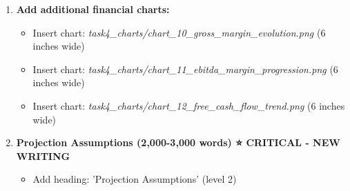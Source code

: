 \documentclass[11pt]{article}
\begin{document}
\begin{enumerate}[leftmargin=*,itemsep=2pt,topsep=2pt]
\begin{itemize}[leftmargin=*,itemsep=2pt,topsep=2pt]
\item {} \textbf{Create Table: Revenue by Product (20-30 rows)}
\begin{itemize}[leftmargin=*,itemsep=2pt,topsep=2pt]
\item {} Use XLSX skill to extract from Revenue Model tab (product section, typically rows 5-35)
\item {} Create Word table showing each product category with historical and projected years
\item {} Include columns: Product name, historical years, projected years, \% of Total, YoY Growth
\end{itemize}
\item {} Insert chart: \emph{task4\_\allowbreak{}charts/chart\_\allowbreak{}04\_\allowbreak{}revenue\_\allowbreak{}by\_\allowbreak{}geography.png} (6.5 inches wide) ⭐ MANDATORY
\item {} \textbf{Create Table: Revenue by Geography (15-20 rows)}
\begin{itemize}[leftmargin=*,itemsep=2pt,topsep=2pt]
\item {} Use XLSX skill to extract from Revenue Model tab (geography section, typically rows 40-60)
\item {} Create Word table showing each geographic region with historical and projected years
\end{itemize}
\end{itemize}
\item {} \textbf{Add additional financial charts:}
\begin{itemize}[leftmargin=*,itemsep=2pt,topsep=2pt]
\item {} Insert chart: \emph{task4\_\allowbreak{}charts/chart\_\allowbreak{}10\_\allowbreak{}gross\_\allowbreak{}margin\_\allowbreak{}evolution.png} (6 inches wide)
\item {} Insert chart: \emph{task4\_\allowbreak{}charts/chart\_\allowbreak{}11\_\allowbreak{}ebitda\_\allowbreak{}margin\_\allowbreak{}progression.png} (6 inches wide)
\item {} Insert chart: \emph{task4\_\allowbreak{}charts/chart\_\allowbreak{}12\_\allowbreak{}free\_\allowbreak{}cash\_\allowbreak{}flow\_\allowbreak{}trend.png} (6 inches wide)
\end{itemize}
\item {} \textbf{Projection Assumptions (2,000-3,000 words) ⭐ CRITICAL - NEW WRITING}
\begin{itemize}[leftmargin=*,itemsep=2pt,topsep=2pt]
\item {} Add heading: 'Projection Assumptions' (level 2)

\end{itemize}
\end{enumerate}
\end{document}
